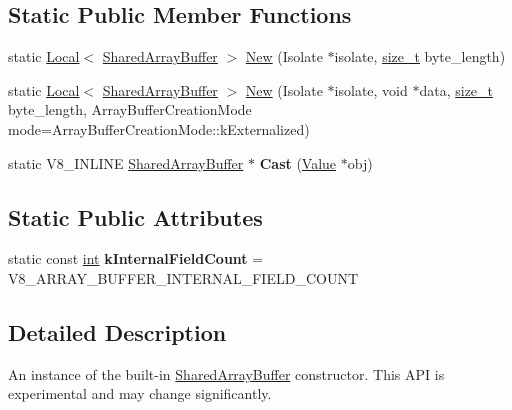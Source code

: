 \subsection*{Static Public Member Functions}
\begin{DoxyCompactItemize}
\item 
static \mbox{\hyperlink{classv8_1_1Local}{Local}}$<$ \mbox{\hyperlink{classv8_1_1SharedArrayBuffer}{Shared\+Array\+Buffer}} $>$ \mbox{\hyperlink{classv8_1_1SharedArrayBuffer_a3162c3d636c0c184db7001086f68a79a}{New}} (Isolate $\ast$isolate, \mbox{\hyperlink{classsize__t}{size\+\_\+t}} byte\+\_\+length)
\item 
static \mbox{\hyperlink{classv8_1_1Local}{Local}}$<$ \mbox{\hyperlink{classv8_1_1SharedArrayBuffer}{Shared\+Array\+Buffer}} $>$ \mbox{\hyperlink{classv8_1_1SharedArrayBuffer_ada351f205ccc0cb9616df676beda7d17}{New}} (Isolate $\ast$isolate, void $\ast$data, \mbox{\hyperlink{classsize__t}{size\+\_\+t}} byte\+\_\+length, Array\+Buffer\+Creation\+Mode mode=Array\+Buffer\+Creation\+Mode\+::k\+Externalized)
\item 
\mbox{\label{classv8_1_1SharedArrayBuffer_ac4e1ba5d4564c7033814f4cc45fdda84}} 
static V8\+\_\+\+I\+N\+L\+I\+NE \mbox{\hyperlink{classv8_1_1SharedArrayBuffer}{Shared\+Array\+Buffer}} $\ast$ {\bfseries Cast} (\mbox{\hyperlink{classv8_1_1Value}{Value}} $\ast$obj)
\end{DoxyCompactItemize}
\subsection*{Static Public Attributes}
\begin{DoxyCompactItemize}
\item 
\mbox{\label{classv8_1_1SharedArrayBuffer_a6f47f6b441e37aefd1a9d0176e8a3da8}} 
static const \mbox{\hyperlink{classint}{int}} {\bfseries k\+Internal\+Field\+Count} = V8\+\_\+\+A\+R\+R\+A\+Y\+\_\+\+B\+U\+F\+F\+E\+R\+\_\+\+I\+N\+T\+E\+R\+N\+A\+L\+\_\+\+F\+I\+E\+L\+D\+\_\+\+C\+O\+U\+NT
\end{DoxyCompactItemize}


\subsection{Detailed Description}
An instance of the built-\/in \mbox{\hyperlink{classv8_1_1SharedArrayBuffer}{Shared\+Array\+Buffer}} constructor. This A\+PI is experimental and may change significantly. 

